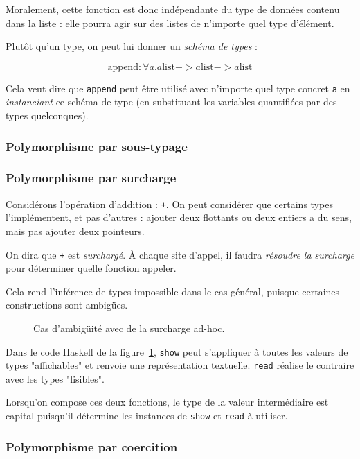 Moralement, cette fonction est donc indépendante du type de données contenu dans
la liste : elle pourra agir sur des listes de n'importe quel type d'élément.

Plutôt qu'un type, on peut lui donner un \emph{schéma de types} :

\[
  \textrm{append} : \forall a . a \textrm{list}
                             -> a \textrm{list}
                             -> a \textrm{list}
\]

Cela veut dire que \texttt{append} peut être utilisé avec n'importe quel type
concret \texttt{a} en \emph{instanciant} ce schéma de type (en substituant les
variables quantifiées par des types quelconques).

\subsubsection{Polymorphisme par sous-typage}

\subsubsection{Polymorphisme par surcharge}

Considérons l'opération d'addition : \texttt{+}. On peut considérer que certains
types l'implémentent, et pas d'autres : ajouter deux flottants ou deux entiers a
du sens, mais pas ajouter deux pointeurs.

On dira que \texttt{+} est \emph{surchargé}. À chaque site d'appel, il faudra
\emph{résoudre la surcharge} pour déterminer quelle fonction appeler.

Cela rend l'inférence de types 
impossible dans le cas général, puisque certaines constructions sont ambigües.

\begin{figure}
  \caption{Cas d'ambigüité avec de la surcharge ad-hoc.}
  \label{fig:showread}
\end{figure}

Dans le code Haskell de la figure~\ref{fig:showread}, \texttt{show} peut
s'appliquer à toutes les valeurs de types "affichables" et renvoie une
représentation textuelle. \texttt{read} réalise le contraire avec les types
"lisibles".

Lorsqu'on compose ces deux fonctions, le type de la valeur intermédiaire est
capital puisqu'il détermine les instances de \texttt{show} et \texttt{read} à
utiliser.

\subsubsection{Polymorphisme par coercition}



